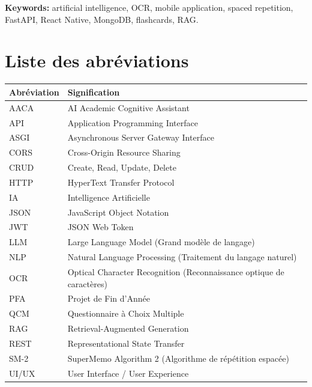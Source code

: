 \documentclass[12pt,a4paper]{report}
\begin{document}
\textbf{Keywords:} artificial intelligence, OCR, mobile application, spaced repetition, FastAPI, React Native, MongoDB, flashcards, RAG.

\tableofcontents
\listoffigures
\listoftables

\chapter*{Liste des abréviations}

\begin{longtable}{p{3.2cm}p{10.8cm}}
\toprule
\textbf{Abréviation} & \textbf{Signification}\\
\midrule
AACA & AI Academic Cognitive Assistant\\
API & Application Programming Interface\\
ASGI & Asynchronous Server Gateway Interface\\
CORS & Cross-Origin Resource Sharing\\
CRUD & Create, Read, Update, Delete\\
HTTP & HyperText Transfer Protocol\\
IA & Intelligence Artificielle\\
JSON & JavaScript Object Notation\\
JWT & JSON Web Token\\
LLM & Large Language Model (Grand modèle de langage)\\
NLP & Natural Language Processing (Traitement du langage naturel)\\
OCR & Optical Character Recognition (Reconnaissance optique de caractères)\\
PFA & Projet de Fin d'Année\\
QCM & Questionnaire à Choix Multiple\\
RAG & Retrieval-Augmented Generation\\
REST & Representational State Transfer\\
SM-2 & SuperMemo Algorithm 2 (Algorithme de répétition espacée)\\
UI/UX & User Interface / User Experience\\
\bottomrule
\end{longtable}

\clearpage
{}

\end{document}
